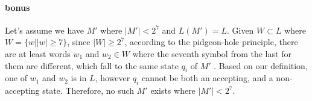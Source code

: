 \documentclass{article}
\begin{document}
\paragraph{bonus}

Let's assume we have $M'$ where $|M'| < 2^7$ and $L(M') = L$. Given $W \subset L$ where $W = \{ w| |w| \geq 7 \}$, since $|W| \geq 2^7$, according to the pidgeon-hole principle, there are at least words $w_1$ and $w_2 \in W$ where the seventh symbol from the last for them are different, which fall to the same state $q_i$ of $M'$ . Based on our definition, one of $w_1$ and $w_2$ is in $L$, however $q_i$ cannot be both an accepting, and a non-accepting state. Therefore, no such $M'$ exists where $|M'| < 2^7$.
\end{document}
